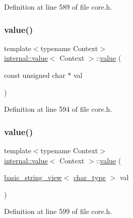 Definition at line 589 of file core.\+h.

\mbox{\label{classinternal_1_1value_a38443f7879cabf02519ef40f53c4a5a8}} 
\subsubsection{\texorpdfstring{value()}{value()}\hspace{0.1cm}{\footnotesize\ttfamily [9/12]}}
{\footnotesize\ttfamily template$<$typename Context$>$ \\
\hyperlink{classinternal_1_1value}{internal\+::value}$<$ Context $>$\+::\hyperlink{classinternal_1_1value}{value} (\begin{DoxyParamCaption}\item[{const unsigned char $\ast$}]{val }\end{DoxyParamCaption})\hspace{0.3cm}{\ttfamily [inline]}}



Definition at line 594 of file core.\+h.

\mbox{\label{classinternal_1_1value_adeb52dcf1b9767046e11899cf6a812ec}} 
\subsubsection{\texorpdfstring{value()}{value()}\hspace{0.1cm}{\footnotesize\ttfamily [10/12]}}
{\footnotesize\ttfamily template$<$typename Context$>$ \\
\hyperlink{classinternal_1_1value}{internal\+::value}$<$ Context $>$\+::\hyperlink{classinternal_1_1value}{value} (\begin{DoxyParamCaption}\item[{\hyperlink{classbasic__string__view}{basic\+\_\+string\+\_\+view}$<$ \hyperlink{classinternal_1_1value_aea7e71c59ab9961b645ed79e69aff80e}{char\+\_\+type} $>$}]{val }\end{DoxyParamCaption})\hspace{0.3cm}{\ttfamily [inline]}}



Definition at line 599 of file core.\+h.

